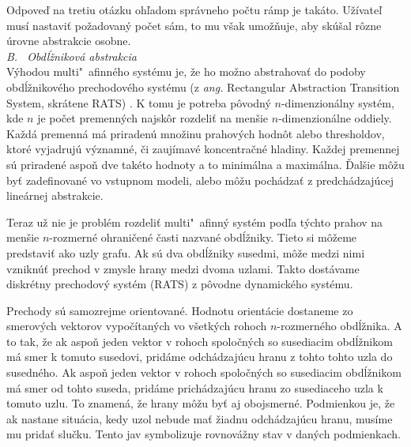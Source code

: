 \documentclass[11pt,final,oneside]{fithesis}
\begin{document}
Odpove\v d na tretiu ot\'azku oh\v ladom spr\'avneho po\v ctu r\'amp je tak\'ato.
U\v z\'ivate\v l mus\'i nastavi\v t po\v zadovan\'y po\v cet s\'am, to mu v\v sak umo\v z\v nuje, aby sk\'u\v sal r\^ ozne \'urovne abstrakcie osobne.
\cite{CAV-2011}
\\

\noindent
\textit{B. \ Obd\'l\v znikov\'a abstrakcia}
\\

V\'yhodou multi"~afinn\'eho syst\'emu je, \v ze ho mo\v zno abstrahova\v t do podoby obd\'l\v znikov\'eho prechodov\'eho syst\'emu (z \textit{ang.}
Rectangular Abstraction Transition System, skr\'atene RATS) \cite{RATS}. K tomu je potreba p\^ ovodn\'y $n$-dimenzion\'alny syst\'em, kde $n$ je po\v cet 
premenn\'ych najsk\^ or rozdeli\v t na men\v sie $n$-dimenzion\'alne oddiely. Ka\v zd\'a premenn\'a m\'a priraden\'u mno\v zinu prahov\'ych hodn\^ ot alebo
thresholdov, ktor\'e vyjadruj\'u v\'yznamn\'e, \v ci zauj\'imav\'e koncentra\v cn\'e hladiny. Ka\v zdej premennej s\'u priraden\'e aspo\v n dve tak\'eto 
hodnoty a to minim\'alna a maxim\'alna. \v Dal\v sie m\^ o\v zu by\v t zadefinovan\'e vo vstupnom modeli, alebo m\^ o\v zu poch\'adza\v t z predch\'adzaj\'ucej
line\'arnej abstrakcie.

Teraz u\v z nie je probl\'em rozdeli\v t multi"~afinn\'y syst\'em pod\v la t\'ychto prahov na men\v sie $n$-rozmern\'e ohrani\v cen\'e \v casti nazvan\'e 
obd\'l\v zniky. Tieto si m\^ o\v zeme predstavi\v t ako uzly grafu. Ak s\'u dva obd\'l\v zniky susedmi, m\^ o\v ze medzi nimi vznikn\'u\v t prechod v zmysle
hrany medzi dvoma uzlami. Takto dost\'avame diskr\'etny prechodov\'y syst\'em (RATS) z p\^ ovodne dynamick\'eho syst\'emu. 

Prechody s\'u samozrejme orientovan\'e. Hodnotu orient\'acie dostaneme zo smerov\'ych vektorov vypo\v c\'itan\'ych vo v\v setk\'ych rohoch $n$-rozmern\'eho 
obd\'l\v znika. A to tak, \v ze ak aspo\v n jeden vektor v rohoch spolo\v cn\'ych so susediacim obd\'l\v znikom m\'a smer k tomuto susedovi, prid\'ame 
odch\'adzaj\'ucu hranu z tohto tohto uzla do susedn\'eho. Ak aspo\v n jeden vektor v rohoch spolo\v cn\'ych so susediacim obd\'l\v znikom m\'a smer od tohto
suseda, prid\'ame prich\'adzaj\'ucu hranu zo susediaceho uzla k tomuto uzlu. To znamen\'a, \v ze hrany m\^ o\v zu by\v t aj obojsmern\'e. Podmienkou je, \v ze
ak nastane situ\'acia, kedy uzol nebude ma\v t \v ziadnu odch\'adzaj\'ucu hranu, mus\'ime mu prida\v t slu\v cku. Tento jav symbolizuje rovnov\'a\v zny stav
v dan\'ych podmienkach.
\end{document}
